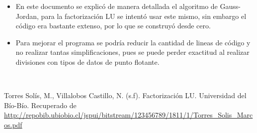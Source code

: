 \documentclass[letterpaper,12pt]{article}
\begin{document}
\begin{itemize}
    \item En este documento se explicó de manera detallada el algoritmo de Gauss-Jordan, para la factorización LU se intentó usar este mismo, sin embargo el código era bastante extenso, por lo que se construyó desde cero.
    \item Para mejorar el programa se podría reducir la cantidad de lineas de código y no realizar tantas simplificaciones, pues se puede perder exactitud al realizar divisiones con tipos de datos de punto flotante.
\end{itemize}
\\
\begin{thebibliography}{99}
Torres Solís, M., Villalobos Castillo, N. (s.f). Factorización LU. Universidad del Bío-Bío. Recuperado de \url{http://repobib.ubiobio.cl/jspui/bitstream/123456789/1811/1/Torres_Solis_Marcos.pdf}

\end{thebibliography}
\end{document}

